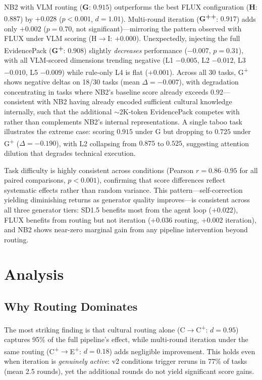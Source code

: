 \documentclass[sigconf, screen, review, anonymous]{acmart}
\newcommand{\Lx}[1]{L#1}
\begin{document}
NB2 with VLM routing (\textbf{G}: $0.915$) outperforms the best FLUX configuration (\textbf{H}: $0.887$) by $+0.028$ ($p < 0.001$, $d = 1.01$).
Multi-round iteration (\textbf{G\textsuperscript{++}}: $0.917$) adds only $+0.002$ ($p = 0.70$, not significant)---mirroring the pattern observed with FLUX under VLM scoring (H$\to$I: $+0.000$).
Unexpectedly, injecting the full EvidencePack (\textbf{G\textsuperscript{+}}: $0.908$) slightly \emph{decreases} performance ($-0.007$, $p = 0.31$), with all VLM-scored dimensions trending negative (\Lx{1} $-0.005$, \Lx{2} $-0.012$, \Lx{3} $-0.010$, \Lx{5} $-0.009$) while rule-only \Lx{4} is flat ($+0.001$).
Across all 30 tasks, G\textsuperscript{+} shows negative deltas on 18/30 tasks (mean $\Delta = -0.007$), with degradation concentrating in tasks where NB2's baseline score already exceeds $0.92$---consistent with NB2 having already encoded sufficient cultural knowledge internally, such that the additional ${\sim}$2K-token EvidencePack competes with rather than complements NB2's internal representations.
A single taboo task illustrates the extreme case: scoring $0.915$ under G but dropping to $0.725$ under G\textsuperscript{+} ($\Delta = -0.190$), with \Lx{2} collapsing from $0.875$ to $0.525$, suggesting attention dilution that degrades technical execution.

Task difficulty is highly consistent across conditions (Pearson $r = 0.86$--$0.95$ for all paired comparisons, $p < 0.001$), confirming that score differences reflect systematic effects rather than random variance.
This pattern---self-correction yielding diminishing returns as generator quality improves---is consistent across all three generator tiers: SD1.5 benefits most from the agent loop ($+0.022$), FLUX benefits from routing but not iteration ($+0.036$ routing, $+0.002$ iteration), and NB2 shows near-zero marginal gain from any pipeline intervention beyond routing.

\section{Analysis}
\label{sec:analysis}

\subsection{Why Routing Dominates}

The most striking finding is that cultural routing alone (C$\to$C\textsuperscript{+}: $d = 0.95$) captures 95\% of the full pipeline's effect, while multi-round iteration under the same routing (C\textsuperscript{+}$\to$E\textsuperscript{+}: $d = 0.18$) adds negligible improvement.
This holds even when iteration is \emph{genuinely active}: v2 conditions trigger reruns in 77\% of tasks (mean 2.5 rounds), yet the additional rounds do not yield significant score gains.
\end{document}
